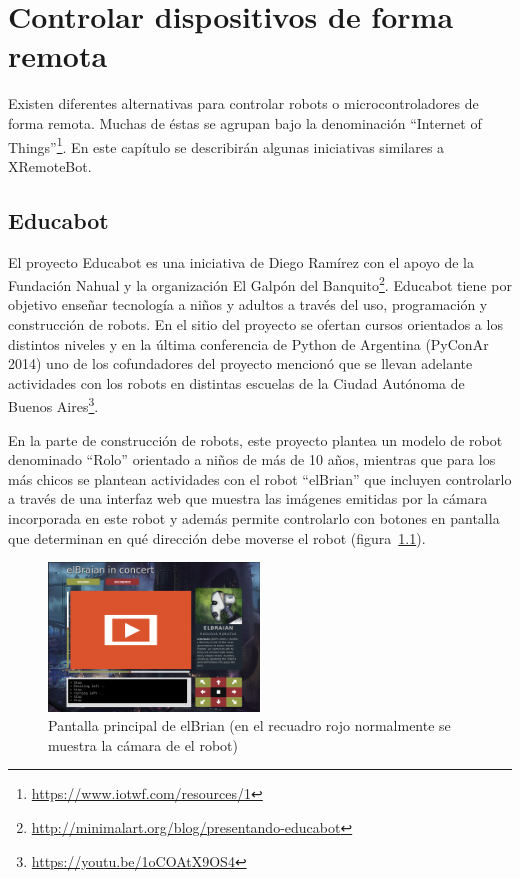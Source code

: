 \chapter{Controlar dispositivos de forma remota}\label{cha:arte}

Existen diferentes alternativas para controlar robots o microcontroladores
de forma remota. Muchas de éstas se agrupan bajo la denominación
``Internet of Things''\footnote{\url{https://www.iotwf.com/resources/1}}.
En este capítulo se describirán algunas iniciativas similares a XRemoteBot.

\section{Educabot}
El proyecto Educabot es una iniciativa de Diego Ramírez con el apoyo de
la Fundación Nahual y la organización
El Galpón del Banquito\footnote{\url{http://minimalart.org/blog/presentando-educabot}}.
Educabot tiene por
objetivo enseñar tecnología a niños y adultos a través
del uso, programación y construcción de robots. En el sitio del proyecto
se ofertan cursos orientados a los distintos niveles y
en la última conferencia de Python de Argentina (PyConAr 2014) uno de
los cofundadores del proyecto mencionó que se llevan adelante actividades
con los robots
en distintas escuelas de la Ciudad Autónoma de Buenos
Aires\footnote{\url{https://youtu.be/1oCOAtX9OS4}}.

En la parte de construcción de robots, este proyecto plantea un modelo
de robot denominado
``Rolo'' orientado a niños de más de 10 años, mientras que para los más
chicos se plantean actividades con el robot ``elBrian'' que incluyen
controlarlo a través de una interfaz web que muestra las imágenes emitidas
por la cámara incorporada en este robot y además permite controlarlo con
botones en pantalla que determinan en qué dirección debe moverse el robot
(figura~\ref{fig:elbrian}).

\begin{figure}
    \centering
    \includegraphics[width=0.5\textwidth]{figures/elbrian-1}
    \caption{Pantalla principal de elBrian (en el recuadro rojo normalmente
        se muestra la cámara de el robot)}
    \label{fig:elbrian}
\end{figure}


